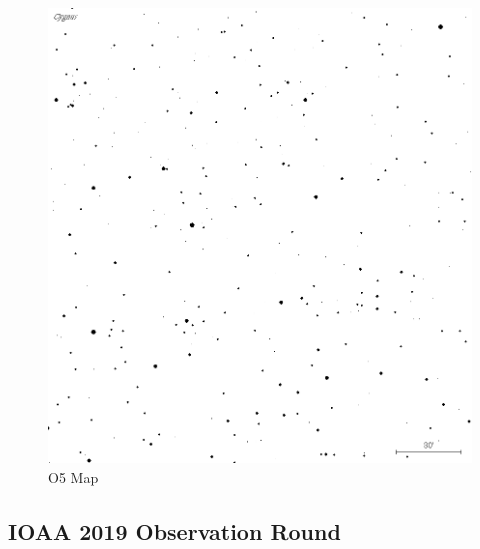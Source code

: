 \documentclass[a4paper,12pt]{extarticle}
\begin{document}
\begin{enumerate}
\begin{figure}[H]
    \centering
    \includegraphics[width=0.95\linewidth]{18_O5.png}
    \caption{O5 Map}
    \label{A2018_O5}
\end{figure}
\end{enumerate}

\clearpage
\subsection{IOAA 2019 Observation Round}
\end{document}
